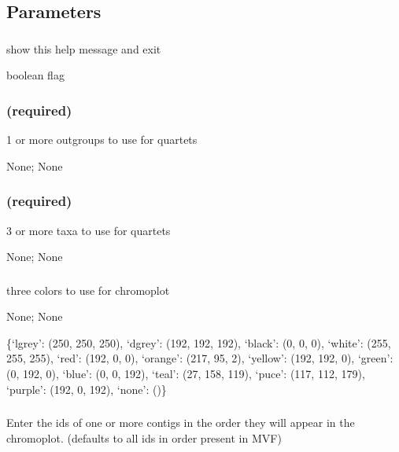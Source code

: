 \documentclass[letterpaper,11pt,english]{sphinxmanual}
\begin{document}
\subsection{Parameters}
\label{\detokenize{prog_desc:id117}}

\subsubsection{}
\label{\detokenize{prog_desc:id118}}
 show this help message and exit

 boolean flag


\subsubsection{ (required)}
\label{\detokenize{prog_desc:outgroup-required}}
 1 or more outgroups to use for quartets

 None;  None


\subsubsection{ (required)}
\label{\detokenize{prog_desc:samples-required}}
 3 or more taxa to use for quartets

 None;  None


\subsubsection{}
\label{\detokenize{prog_desc:colors}}
 three colors to use for chromoplot

 None;  None

 \{‘lgrey’: (250, 250, 250), ‘dgrey’: (192, 192, 192), ‘black’: (0, 0, 0), ‘white’: (255, 255, 255), ‘red’: (192, 0, 0), ‘orange’: (217, 95, 2), ‘yellow’: (192, 192, 0), ‘green’: (0, 192, 0), ‘blue’: (0, 0, 192), ‘teal’: (27, 158, 119), ‘puce’: (117, 112, 179), ‘purple’: (192, 0, 192), ‘none’: ()\}


\subsubsection{}
\label{\detokenize{prog_desc:id119}}
 Enter the ids of one or more contigs in the order they will appear in the chromoplot. (defaults to all ids in order present in MVF)
\end{document}
